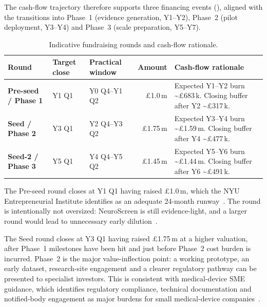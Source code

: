 The cash-flow trajectory therefore supports three financing events (), aligned with the transitions into Phase~1 (evidence generation, Y1--Y2), Phase~2 (pilot deployment, Y3--Y4) and Phase~3 (scale preparation, Y5--Y7).

\begin{table}[htbp]
    \centering
    \caption{Indicative fundraising rounds and cash-flow rationale.}
    \label{tab:funding-rounds}
    \begin{tabular}{lllrp{6cm}}
        \toprule
        \textbf{Round} & \textbf{Target close} & \textbf{Practical window} & \textbf{Amount} & \textbf{Cash-flow rationale} \\
        \midrule
        \textbf{Pre-seed / Phase 1} & Y1 Q1 & Y0 Q4--Y1 Q2 & \pounds1.0\,m  & Expected Y1--Y2 burn \textasciitilde\pounds683\,k. Closing buffer after Y2 \textasciitilde\pounds317\,k. \\
        \midrule
        \textbf{Seed / Phase 2}     & Y3 Q1 & Y2 Q4--Y3 Q2 & \pounds1.75\,m & Expected Y3--Y4 burn \textasciitilde\pounds1.59\,m. Closing buffer after Y4 \textasciitilde\pounds477\,k. \\
        \midrule
        \textbf{Seed-2 / Phase 3}   & Y5 Q1 & Y4 Q4--Y5 Q2 & \pounds1.45\,m & Expected Y5--Y6 burn \textasciitilde\pounds1.44\,m. Closing buffer after Y6 \textasciitilde\pounds491\,k. \\
        \bottomrule
    \end{tabular}
\end{table}

The Pre-seed round closes at Y1 Q1 having raised \pounds1.0\,m, which the NYU Entrepreneurial Institute identifies as an adequate 24-month runway~\cite{nyu_runway}. The round is intentionally not oversized: NeuroScreen is still evidence-light, and a larger round would lead to unnecessary early dilution~\cite{carta_fundraising}.

The Seed round closes at Y3 Q1 having raised \pounds1.75\,m at a higher valuation, after Phase~1 milestones have been hit and just before Phase~2 cost burden is incurred. Phase~2 is the major value-inflection point: a working prototype, an early dataset, research-site engagement and a clearer regulatory pathway can be presented to specialist investors. This is consistent with medical-device SME guidance, which identifies regulatory compliance, technical documentation and notified-body engagement as major burdens for small medical-device companies~\cite{bsi_sme_roadmap}.


